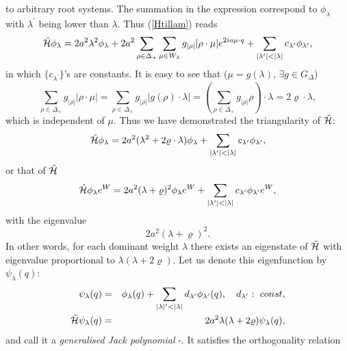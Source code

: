 \documentclass[a4paper,12pt]{article}
\begin{document}
to arbitrary root systems.
The summation in the expression correspond to
\(\phi_{\lambda^\prime}\) with \(\lambda^\prime\) being lower than
\(\lambda\).
Thus (\ref{Htillam}) reads
\begin{equation}
   \tilde{\cal H}\phi_{\lambda}=2a^2\lambda^2\phi_{\lambda}
   +2a^2\sum_{\rho\in\Delta_+}\sum_{\mu\in
   W_{\lambda}}{g_{|\rho|}}
   |\rho\cdot\mu| e^{2ia\mu\cdot q}
   +\sum_{|\lambda^\prime|<|\lambda|}
   c_{\lambda^\prime}\phi_{\lambda^\prime},
   \label{Htillam2}
\end{equation}
in which \(\{c_{\lambda^\prime}\}\)'s are constants.
It is easy to see that (\(\mu=g(\lambda)\), \(\exists g\in G_{\Delta}\))
\begin{equation}
   \sum_{\rho\in\Delta_+}{g_{|\rho|}}
   |\rho\cdot\mu| =\sum_{\rho\in\Delta_+}{g_{|\rho|}}
   |g(\rho)\cdot\lambda|=(\sum_{\rho\in\Delta_+}{g_{|\rho|}}
   \rho)\cdot\lambda=2\varrho\cdot\lambda,
\end{equation}
which is independent of \(\mu\).
Thus we have demonstrated the triangularity of \(\tilde{\cal H}\):
\begin{equation}
   \tilde{\cal
   H}\phi_{\lambda}=2a^2(\lambda^2+2\varrho\cdot\lambda)\phi_{\lambda}
   +\sum_{|\lambda^\prime|<|\lambda|}c_{\lambda^\prime}
   \phi_{\lambda^\prime},
   \label{Htillam3}
\end{equation}
or that of \(\hat{\cal H}\)
\begin{equation}
   \hat{\cal H}\phi_{\lambda}e^W=2a^2(\lambda+\varrho)^2\phi_{\lambda}e^W
   +\sum_{|\lambda^\prime|<|\lambda|}c_{\lambda^\prime}
   \phi_{\lambda^\prime}e^W,
   \label{Hhatlam3}
\end{equation}
with the eigenvalue
\begin{equation}
   2a^2(\lambda+\varrho)^2.
   \label{trigspec}
\end{equation}
In other words, for each dominant weight \(\lambda\) there exists an
eigenstate of \(\tilde{\cal H}\) with eigenvalue proportional to
$\lambda(\lambda+2\varrho)$. Let us denote this eigenfunction
by $\psi_{\lambda}(q)$:
\begin{eqnarray}
\psi_{\lambda}(q)&=&\phi_{\lambda}(q)+\sum_{|\lambda|^\prime<|\lambda|}
d_{\lambda^\prime} \phi_{\lambda^\prime}(q),\quad d_{\lambda^\prime}:\
const,\\
 \tilde{\cal
H}\psi_{\lambda}(q)&=&2a^2\lambda(\lambda+2\varrho)\psi_{\lambda}(q),
\end{eqnarray}
and call it a {\em generalised Jack polynomial\/}
\cite{Stan}-\cite{Awat}. It satisfies the orthogonality relation
\end{document}
